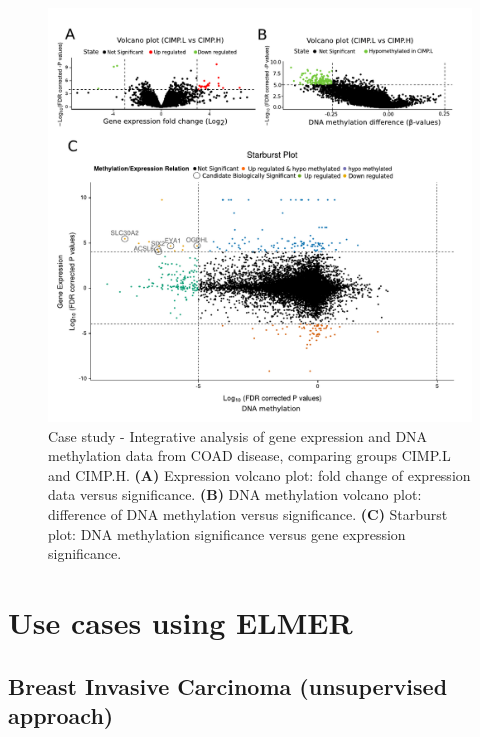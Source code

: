\begin{figure}
\centering
\includegraphics[width=1.0\linewidth]{images/figure5.pdf}
\caption[Case study - Integrative data analysis of Colon Adenocarcinoma]{
Case study - Integrative analysis of gene expression and DNA methylation data from COAD disease,
comparing groups CIMP.L and CIMP.H. \textbf{(A)} Expression volcano plot: fold change of expression data versus significance.
 \textbf{(B)} DNA methylation volcano plot: difference of DNA methylation versus significance.
 \textbf{(C)} Starburst plot: DNA methylation significance versus gene expression significance.}
\label{fig:case_starburst}
\end{figure}


\section{Use cases using ELMER}\label{sec:analysis_elmer}

\subsection{Breast Invasive Carcinoma (unsupervised approach)} %

